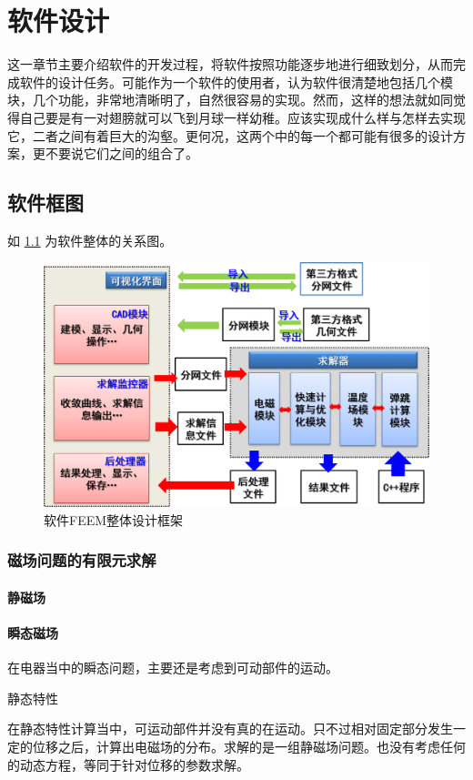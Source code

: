 \chapter{软件设计}
这一章节主要介绍软件的开发过程，将软件按照功能逐步地进行细致划分，从而完成软件的设计任务。可能作为一个软件的使用者，认为软件很清楚地包括几个模块，几个功能，非常地清晰明了，自然很容易的实现。然而，这样的想法就如同觉得自己要是有一对翅膀就可以飞到月球一样幼稚。应该实现成什么样与怎样去实现它，二者之间有着巨大的沟壑。更何况，这两个中的每一个都可能有很多的设计方案，更不要说它们之间的组合了。
\section{软件框图}
如 \figurename{} \ref{fig:softarch} 为软件整体的关系图。
\begin{figure}[h]
	\centering
	\includegraphics[width=0.7\linewidth]{figures/softarch}
	\caption{软件FEEM整体设计框架}
	\label{fig:softarch}
\end{figure}

\subsection{磁场问题的有限元求解}

\subsubsection{静磁场}

\subsubsection{瞬态磁场}
在电器当中的瞬态问题，主要还是考虑到可动部件的运动。

静态特性

在静态特性计算当中，可运动部件并没有真的在运动。只不过相对固定部分发生一定的位移之后，计算出电磁场的分布。求解的是一组静磁场问题。也没有考虑任何的动态方程，等同于针对位移的参数求解。

